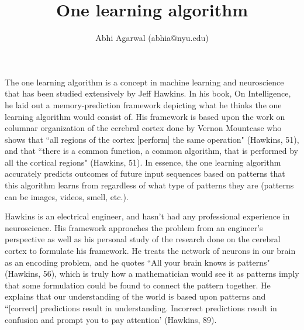 \documentclass[11pt, oneside]{article}
\title{One learning algorithm}
\author{Abhi Agarwal (abhia@nyu.edu)}
\date{}
\begin{document}
\maketitle

\par The one learning algorithm is a concept in machine learning and neuroscience that has been studied extensively by Jeff Hawkins. In his book, On Intelligence, he laid out a memory-prediction framework depicting what he thinks the one learning algorithm would consist of. 
His framework is based upon the work on columnar organization of the cerebral cortex done by Vernon Mountcase who shows that ``all regions of the cortex [perform] the same operation" (Hawkins, 51), and that ``there is a common function, a common algorithm, that is performed by all the cortical regions" (Hawkins, 51). In essence, the one learning algorithm accurately predicts outcomes of future input sequences based on patterns that this algorithm learns from regardless of what type of patterns they are (patterns can be images, videos, smell, etc.).

\par 
Hawkins is an electrical engineer, and hasn't had any professional experience in neuroscience. His framework approaches the problem from an engineer's perspective as well as his personal study of the research done on the cerebral cortex to formulate his framework. 
He treats the network of neurons in our brain as an encoding problem, and he quotes ``All your brain knows is patterns" (Hawkins, 56), which is truly how a mathematician would see it as patterns imply that some formulation could be found to connect the pattern together. 
He explains that our understanding of the world is based upon patterns and ``[correct] predictions result in understanding. Incorrect predictions result in confusion and prompt you to pay attention' (Hawkins, 89). 
\end{document}
